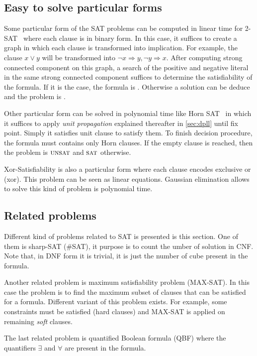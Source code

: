 \subsection{Easy to solve particular forms}
Some particular form of the SAT problems can be computed in linear time for 2-SAT~\cite{aspvall1979linear}
where each clause is in binary form. In this case, it suffices to create a graph in which each clause is transformed into implication. For example, the clause $x \lor y$ will be transformed into $ \neg x \Rightarrow y,
\neg y \Rightarrow x$. After computing strong connected component on this graph, a 
search of the positive and negative literal in the same  strong connected component suffices 
to determine the satisfiability of the formula. If it is the case, the formula is \unsat. Otherwise 
a solution can be deduce and the problem is \sat.

Other particular form  can be solved in  polynomial time like Horn SAT~\cite{aspvall1979linear} in which it suffices to  apply \emph{unit propagation} explained thereafter in \cref{sec:dpll} until fix point. Simply it satisfies unit clause to satisfy them. To finish decision procedure, the formula must contains only Horn clauses. If the empty clause is reached, then the problem is
$\textsc{unsat}$ and $\textsc{sat}$ otherwise.

Xor-Satisfiability  is also a particular form where each clause encodes exclusive or (xor).
This problem can be seen as linear equations. Gaussian elimination allows to solve this kind of
problem is polynomial time.


\subsection{Related problems}

Different kind of problems related to SAT is presented is this section.
One of them is sharp-SAT (\#SAT), it purpose is to count the umber of solution in CNF.
Note that, in DNF form it is trivial, it is just the number of cube present in the formula.

Another related problem is maximum satisfiability problem (MAX-SAT). In this case the problem
is to find the maximum subset of clauses that can be satisfied for a formula. Different variant
of this problem exists. For example, some constraints must be satisfied (hard clauses) and MAX-SAT
is applied on remaining \emph{soft} clauses.

The last related problem is quantified Boolean formula (QBF) where the quantifiers $\exists$ and
$\forall$ are present in the formula.


